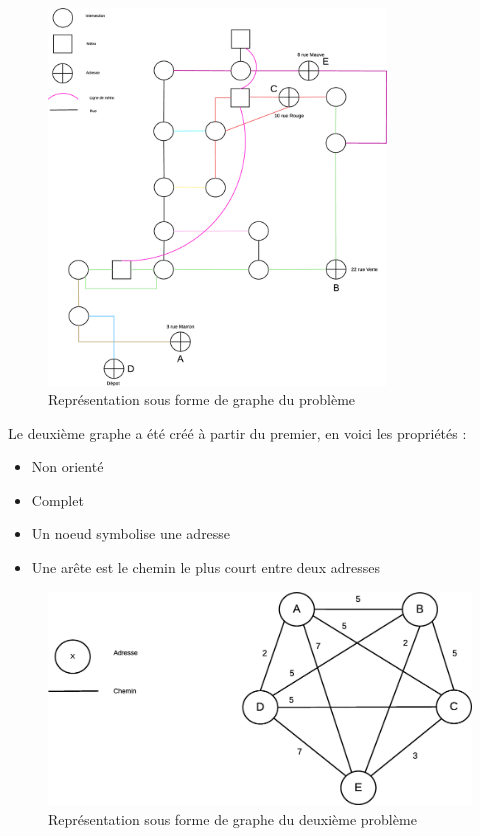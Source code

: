     \begin{figure}
            \centering
                \includegraphics[width=0.8\textwidth]{images/graphe.eps}
            \caption{Représentation sous forme de graphe du problème}
            \label{fig:graphe} %
    \end{figure}

    \newpage

    Le deuxième graphe a été créé à partir du premier, en voici les propriétés :

    \begin{itemize}
     \item Non orienté
     \item Complet
     \item Un noeud symbolise une adresse
     \item Une arête est le chemin le plus court entre deux adresses
    \end{itemize}


    \begin{figure}[h!]
            \centering
                \includegraphics[width=1\textwidth]{images/graphe2.eps}
            \caption{Représentation sous forme de graphe du deuxième problème}
            \label{fig:graphe} %
    \end{figure}

